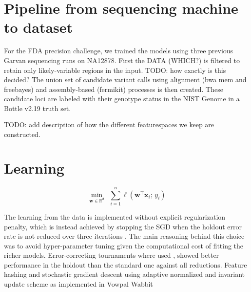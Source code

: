 \documentclass{article}
\newcommand{\w}{\mathbf{w}}
\newcommand{\x}{\mathbf{x}}
\newcommand{\R}{\mathbb{R}}
\newcommand{\tr}{{\!\top}}
\begin{document}



\section{Pipeline from sequencing machine to dataset}



For the FDA precision challenge, we trained the models using three previous Garvan sequencing runs on NA12878.
First the DATA (WHICH?) is filtered to retain only likely-variable regions in the input. TODO: how exactly is this decided?
The union set of candidate variant calls using alignment (bwa mem and freebayes) and assembly-based (fermikit) processes is then created.
These candidate loci are labeled with their genotype status in the NIST Genome in a Bottle v2.19 truth set. 

TODO: add description of how the different featurespaces we keep are constructed.

\section{Learning}

\begin{equation}
  \min_{\w \in \R^d}~~\sum_{i=1}^n\ell(\w^\tr\x_i;\,y_i) 
  \label{eqn:objective}
\end{equation}

The learning from the data is implemented without explicit regularization penalty, which is instead achieved by stopping the SGD when the holdout error rate is not reduced over three iterations \citep{hardt2015train}.
The main reasoning behind this choice was to avoid hyper-parameter tuning given the computational cost of fitting the richer models.
Error-correcting tournaments where used
\citep{beygelzimer2009error}, showed better performance in the holdout than the standard one against all reductions. 
Feature hashing and stochastic gradient descent using adaptive normalized and invariant update scheme as implemented in Vowpal Wabbit \cite{mcmahan2010adaptive, duchi2011adaptive, agarwal2014reliable} 
\end{document}
